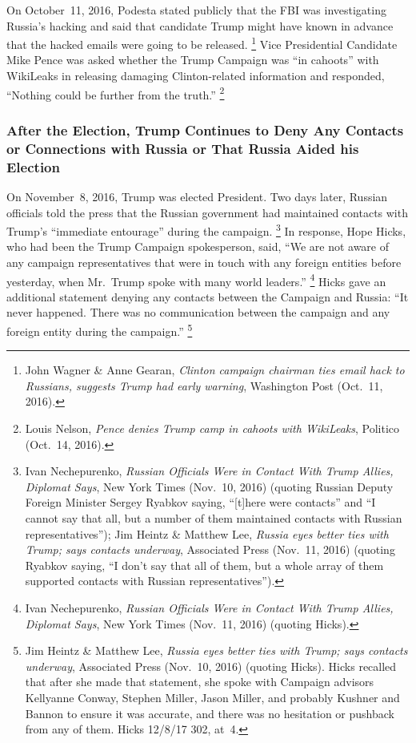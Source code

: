 On October~11, 2016, Podesta stated publicly that the FBI was investigating Russia's hacking and said that candidate Trump might have known in advance that the hacked emails were going to be released.%
\footnote{John Wagner \& Anne Gearan, \textit{Clinton campaign chairman ties email hack to Russians, suggests Trump had early warning}, Washington Post (Oct.~11, 2016).}
Vice Presidential Candidate Mike Pence was asked whether the Trump Campaign was ``in cahoots'' with WikiLeaks in releasing damaging Clinton-related information and responded, ``Nothing could be further from the truth.''%
\footnote{Louis Nelson, \textit{Pence denies Trump camp in cahoots with WikiLeaks}, Politico (Oct.~14, 2016).}

\subsubsection{After the Election, Trump Continues to Deny Any Contacts or Connections with Russia or That Russia Aided his Election}

On November~8, 2016, Trump was elected President.
Two days later, Russian officials told the press that the Russian government had maintained contacts with Trump's ``immediate entourage'' during the campaign.%
\footnote{Ivan Nechepurenko, \textit{Russian Officials Were in Contact With Trump Allies, Diplomat Says}, New York Times (Nov.~10, 2016) (quoting Russian Deputy Foreign Minister Sergey Ryabkov saying, ``[t]here were contacts'' and ``I cannot say that all, but a number of them maintained contacts with Russian representatives'');
Jim Heintz \& Matthew Lee, \textit{Russia eyes better ties with Trump; says contacts underway}, Associated Press (Nov.~11, 2016) (quoting Ryabkov saying, ``I don't say that all of them, but a whole array of them supported contacts with Russian representatives'').}
In response, Hope Hicks, who had been the Trump Campaign spokesperson, said, ``We are not aware of any campaign representatives that were in touch with any foreign entities before yesterday, when Mr.~Trump spoke with many world leaders.''%
\footnote{Ivan Nechepurenko, \textit{Russian Officials Were in Contact With Trump Allies, Diplomat Says}, New York Times (Nov.~11, 2016) (quoting Hicks).}
Hicks gave an additional statement denying any contacts between the Campaign and Russia:
``It never happened.
There was no communication between the campaign and any foreign entity during the campaign.''%
\footnote{Jim Heintz \& Matthew Lee, \textit{Russia eyes better ties with Trump; says contacts underway}, Associated Press (Nov.~10, 2016) (quoting Hicks).
Hicks recalled that after she made that statement, she spoke with Campaign advisors Kellyanne Conway, Stephen Miller, Jason Miller, and probably Kushner and Bannon to ensure it was accurate, and there was no hesitation or pushback from any of them.
Hicks 12/8/17 302, at~4.}

